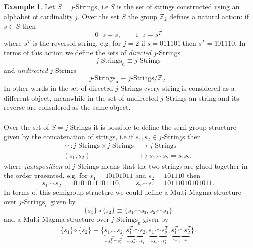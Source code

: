 \documentclass[letterpaper,12pt]{article}
\theoremstyle{definition}
\newtheorem{exmp}{Example}[section]
\begin{document}
\begin{exmp}\label{exmpstrings}
Let $S=j$-Strings, i.e $S$ is the set of strings constructed using an alphabet of cardinality $j$. Over the set $S$ the group $\mathbb{Z}_2$ defines a natural action: if $s \in S$ then 
\begin{equation}
    0 \cdot s=s, \qquad  1 \cdot s=s^T
\end{equation}
where $s^T$ is the reversed string, e.g. for $j=2$ if $s=011101$ then $s^T=101110$.
 In terms of this action we define the sets of \textit{directed} $j$-Strings 
\begin{equation}
j\text{-Strings}_{\text{d}} \equiv j\text{-Strings} 
\end{equation}
and \textit{undirected} $j$-Strings 
\begin{equation}
 j\text{-Strings}_{\text{u}} \equiv j\text{-Strings}/\mathbb{Z}_2.
\end{equation}
In other words in the set of directed $j$-Strings every string is considered as a different object, meanwhile in the set of undirected $j$-Strings an string and its reverse are considered as the same object. \\\\
Over the set of $S=j$-Strings it is possible to define the semi-group structure given by the concatenation of strings, i.e if $s_1,s_2 \in j$-Strings then 
\begin{equation}
\begin{split}
    \frown: j\text{-Strings} \times j\text{-Strings} & \to j\text{-Strings} \\
    (s_1,s_2) & \mapsto s_1 \frown s_2=s_1s_2,
    \end{split}
\end{equation}
where \textit{juxtaposition} of $j$-Strings means that the two strings are glued together in the order presented, e.g. for $s_1=10101011$ and $s_2=101110$ then  
\begin{equation*}
   s_1 \frown s_2 = 10101011101110, \qquad s_2 \frown s_1= 10111010101011.
\end{equation*}
In terms of this semigroup structure we could define a Multi-Magma structure over $j\text{-Strings}_\text{d}$ given by
\begin{equation}
        \{s_1\} \circ \{s_2\} \equiv \{s_1 \frown s_2, s_2 \frown s_1\}
    \end{equation}
and a Multi-Magma structure over $j\text{-Strings}_{\text{u}}$ given by
\begin{equation}
\begin{split}
          \{s_1\} \circ \{s_2\} \equiv \{ \underbrace{s_1 \frown s_2}_{\sim s_2^T \frown s_1^T }, \underbrace{s_1^T \frown s_2}_{\sim s_2^T \frown s_1}, \underbrace{s_1 \frown s_2^T}_{ \sim s_2 \frown s_1^T}, \underbrace{s_1^T \frown s_2^T}_{\sim s_2 \frown s_1}\}.  
\end{split}
\end{equation}


\end{exmp}
\end{document}
